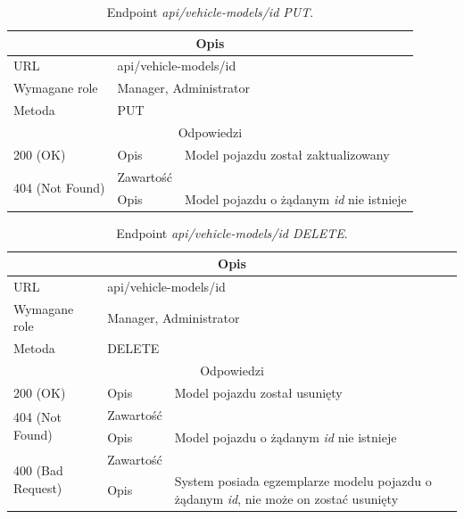 \documentclass[eng,printmode,openany]{mgr}
\begin{document}
	\begin{table}[H]
		\caption{Endpoint \textit{api/vehicle-models/id PUT}.}
		\begin{tabularx}{\textwidth}{|l|l|X|}
			\hline
			\multicolumn{3}{|c|}{Opis}
			\\ \hline
			URL                       & \multicolumn{2}{l|}{api/vehicle-models/id}
			\\ \hline
			Wymagane role             & \multicolumn{2}{l|}{Manager, Administrator}
			\\ \hline
			Metoda                    & \multicolumn{2}{l|}{PUT}
			\\ \hline
			\multicolumn{3}{|c|}{Odpowiedzi}
			\\ \hline
			200 (OK) 		 & Opis      	& Model pojazdu został zaktualizowany
			\\ \hline
			\multirow{2}{*}{404 (Not Found)} 	    & Zawartość     &   
			\\ \cline{2-3}                          & Opis          & Model pojazdu o żądanym \textit{id} nie istnieje
			\\ \hline
		\end{tabularx}
	\end{table}
	
	\begin{table}[H]
		\caption{Endpoint \textit{api/vehicle-models/id DELETE}.}
		\begin{tabularx}{\textwidth}{|l|l|X|}
			\hline
			\multicolumn{3}{|c|}{Opis}
			\\ \hline
			URL                       & \multicolumn{2}{l|}{api/vehicle-models/id}
			\\ \hline
			Wymagane role             & \multicolumn{2}{l|}{Manager, Administrator}
			\\ \hline
			Metoda                    & \multicolumn{2}{l|}{DELETE}
			\\ \hline
			\multicolumn{3}{|c|}{Odpowiedzi}
			\\ \hline
			200 (OK)			                & Opis         	& Model pojazdu został usunięty
			\\ \hline
			\multirow{2}{*}{404 (Not Found)} 	& Zawartość     &    	
			\\ \cline{2-3}                      & Opis          & Model pojazdu o żądanym \textit{id} nie istnieje
			\\ \hline
			\multirow{2}{*}{400 (Bad Request)} 	& Zawartość     &    	
			\\ \cline{2-3}                      & Opis          & System posiada egzemplarze modelu pojazdu o żądanym \textit{id}, nie może on zostać usunięty
			\\ \hline
		\end{tabularx}
	\end{table}
	
\end{document}

